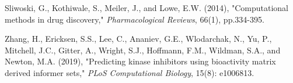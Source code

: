 \documentclass[12pt]{article}
\begin{document}
\begin{list}{}{}
\item Sliwoski, G., Kothiwale, S., Meiler, J., and Lowe, E.W. (2014), "Computational methods in drug discovery," {\em Pharmacological Reviews}, 66(1), pp.334-395.

\item  Zhang, H.,   Ericksen, S.S.,  Lee, C.,  Ananiev, G.E., Wlodarchak, N., Yu, P., Mitchell, J.C.,  Gitter, A.,  Wright, S.J., Hoffmann, F.M.,  Wildman, S.A., and 
Newton, M.A. (2019), "Predicting kinase inhibitors using bioactivity matrix derived informer sets," {\em PLoS Computational Biology}, 15(8): e1006813. 


\end{list}
\end{document}
